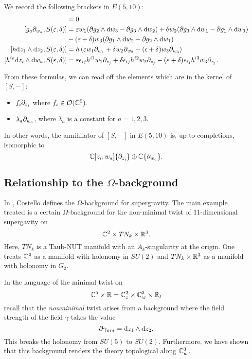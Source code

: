 \documentclass[11pt]{amsart}
\def\vep{\varepsilon}
\begin{document}
We record the following brackets in $E(5,10)$:
\begin{align*}
[f_i \del_{z_i}, S(\vep,\delta)] & = 0 \\
[g_a \del_{w_a}, S(\vep, \delta)] & = \vep w_1 (\del g_2 \wedge \d w_3 - \del g_3 \wedge \d w_2) 
+ \delta w_2 (\del g_3 \wedge \d w_1 - \del g_1 \wedge \d w_3) \\
& - (\vep + \delta) w_3 (\del g_1 \wedge \d w_2 - \del g_2 \wedge \d w_1) \\
[h \d z_1 \wedge \d z_2 , S(\vep, \delta)] & = h \left(\vep w_1 \del_{w_1} + \delta w_2 \del_{w_2} - (\ep + \delta) w_3 \del_{w_3} \right) \\
[h^{ia} \d z_i \wedge \d w_a, S(\vep, \delta)] & = \vep \ep_{ij} h^{i1} w_1 \del_{z_j} + \delta \ep_{ij} h^{i2} w_2 \del_{z_j} - (\vep + \delta) \ep_{ij} h^{i3} w_3 \del_{z_j} .
\end{align*} 

From these formulas, we can read off the elements which are in the kernel of $[S,-]$:
\begin{itemize}
\item $f_i \partial_{z_i}$ where $f_i \in \mathcal O(\mathbb C^5)$. 
\item $\lambda_a \partial_{w_a}$, where $\lambda_a$ is a constant for $a=1,2,3$.  
\end{itemize}
In other words, the annihilator of $[S,-]$ in $E(5,10)$ is, up to completions, isomorphic to 
\[
\mathbb C[z_i, w_a] \{\partial_{z_i}\} \oplus \mathbb C\{\partial_{w_a}\} .
\]

\subsection{Relationship to the $\Omega$-background}


In \cite{CostelloOmega}, Costello defines the $\Omega$-background for supergravity. 
The main example treated is a certain $\Omega$-background for the non-minimal twist of 11-dimensional supergavity on 
\[
\mathbb C^2 \times TN_k \times \mathbb R^3 .
\]
Here, $TN_k$ is a Taub-NUT manifold with an $A_k$-singularity at the origin. 
One treats $\mathbb C^2$ as a manifold with holonomy in $SU(2)$ and $TN_k \times \mathbb R^3$ as a manifold with holonomy in $G_2$.

In the language of the minimal twist on 
\[
\mathbb C^5 \times \mathbb R = \mathbb C^2_{z} \times \mathbb C^3_w \times \mathbb R_t 
\]
recall that the {\em nonminimal} twist arises from a background where the field strength of the field $\gamma$ takes the value 
\[
\partial \gamma_{nm} = {\rm d} z_1 \wedge {\rm d} z_2 .
\]
This breaks the holonomy from $SU(5)$ to $SU(2)$.
Furthermore, we have shown that this background renders the theory topological along $\mathbb C^3_w$. 
\end{document}
